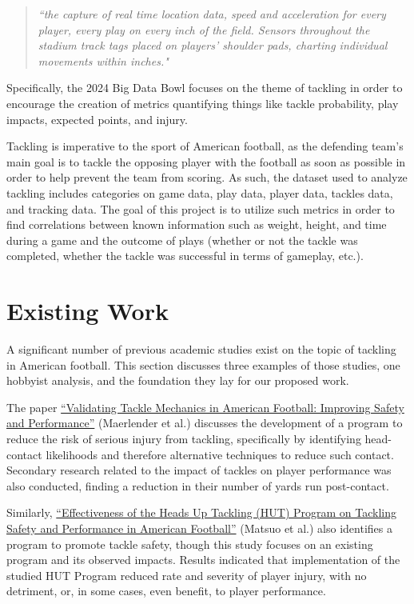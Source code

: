 \documentclass[bibtex, sigconf, hyperref={colorlinks=true,linkcolor=blue,urlcolor=blue}]{acmart}
\begin{document}
\begin{quote}
\textit{``the capture of real time location data, speed and acceleration for
every player, every play on every inch of the field. Sensors throughout the
stadium track tags placed on players' shoulder pads, charting individual
movements within inches."}
\cite{nextgenstats}
\end{quote}

Specifically, the 2024 Big Data Bowl focuses on the theme of tackling in order
to encourage the creation of metrics quantifying things like tackle probability,
play impacts, expected points, and injury.

Tackling is imperative to the sport of American football, as the defending
team's main goal is to tackle the opposing player with the football as soon as
possible in order to help prevent the team from scoring. As such, the dataset
used to analyze tackling includes categories on game data, play data, player
data, tackles data, and tracking data. The goal of this project is to utilize
such metrics in order to find correlations between known information such as
weight, height, and time during a game and the outcome of plays (whether or not
the tackle was completed, whether the tackle was successful in terms of
gameplay, etc.).

\section{Existing Work}

A significant number of previous academic studies exist on the topic of tackling
in American football. This section discusses three examples of those studies,
one hobbyist analysis, and the foundation they lay for our proposed work.

The paper
\href{https://link.springer.com/article/10.1007/s10439-020-02625-7}{“Validating
Tackle Mechanics in American Football: Improving Safety and
Performance”}\cite{validatingtackles} (Maerlender et al.) discusses the
development of a program to reduce the risk of serious injury from tackling,
specifically by identifying head-contact likelihoods and therefore alternative
techniques to reduce such contact. Secondary research related to the impact of
tackles on player performance was also conducted, finding a reduction in their
number of yards run post-contact.

Similarly,
\href{https://www.jstage.jst.go.jp/article/ijshs/16/0/16_201804/_article/-char/ja/}
{“Effectiveness of the Heads Up Tackling (HUT) Program on Tackling Safety and
Performance in American Football”}\cite{effectiveness} (Matsuo et al.) also
identifies a program to promote tackle safety, though this study focuses on an
existing program and its observed impacts. Results indicated that implementation
of the studied HUT Program reduced rate and severity of player injury, with no
detriment, or, in some cases, even benefit, to player performance.
\end{document}
